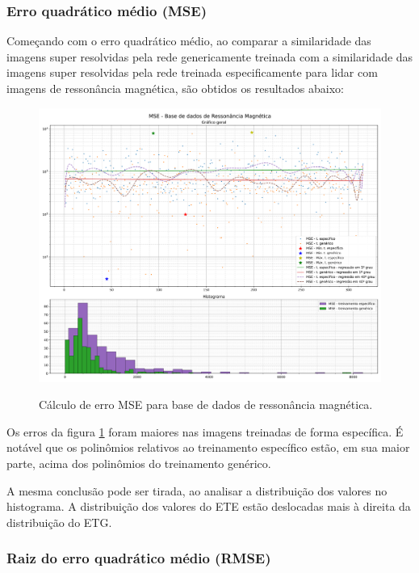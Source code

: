 \subsubsection{Erro quadrático médio (MSE)}
\label{sec:result:mri:mse}

Começando com o erro quadrático médio, ao comparar a similaridade das imagens super resolvidas pela rede genericamente treinada com a similaridade das imagens super resolvidas pela rede treinada especificamente para lidar com imagens de ressonância magnética, são obtidos os resultados abaixo:

\begin{figure}[H]
    \centering
    \caption{Cálculo de erro MSE para base de dados de ressonância magnética.}
    \includegraphics[width=16cm]{fig/resultados/mri/png/mse_mri_compound.png}
    \label{fig:results:fig1}
\end{figure}

Os erros da figura \ref{fig:results:fig1} foram maiores nas imagens treinadas de forma específica. É notável que os polinômios relativos ao treinamento específico estão, em sua maior parte, acima dos polinômios do treinamento genérico. 

A mesma conclusão pode ser tirada, ao analisar a distribuição dos valores no histograma. A distribuição dos valores do ETE estão deslocadas mais à direita da distribuição do ETG. 


\subsubsection{Raiz do erro quadrático médio (RMSE)}
\label{sec:result:mri:rmse}


